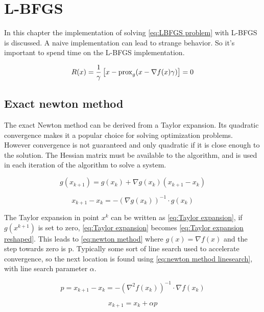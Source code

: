 \chapter{L-BFGS}
	In this chapter the implementation of solving \eqref{eq:LBFGS problem} with L-BFGS is discussed. A naive implementation can lead to strange behavior. So it's important to spend time on the L-BFGS implementation.
	
	
	\begin{equation}
	R(x) = \frac{1}{\gamma}\left[ x - \operatorname{prox}_g( x - \nabla f(x)\gamma) \right] = 0
	\label{eq:LBFGS problem}
	\end{equation}
	
	\section{Exact newton method}
	The exact Newton method can be derived from a Taylor expansion. Its quadratic convergence makes it a popular choice for solving optimization problems. However convergence is not guaranteed and only quadratic if it is close enough to the solution. The Hessian matrix must be available to the algorithm, and is used in each iteration of the algorithm to solve a system.
	
		\begin{equation}
			g(x_{k+1}) = g(x_k) + \nabla g(x_k)(x_{k+1}-x_k)
			\label{eq:Taylor expansion}
		\end{equation}
		
		\begin{equation}
			x_{k+1}-x_k = -(\nabla g(x_k))^{-1} \cdot g(x_k)
			\label{eq:Taylor expansion reshaped}
		\end{equation}
		
	The Taylor expansion in point $x^k$ can be written as \eqref{eq:Taylor expansion}, if $g(x^{k+1})$ is set to zero, \eqref{eq:Taylor expansion} becomes \eqref{eq:Taylor expansion reshaped}. This leads to \eqref{eq:newton method} where $g(x)=\nabla f(x)$ and the step towards zero is p. Typically some sort of line search used to accelerate convergence, so the next location is found using \eqref{eq:newton method linesearch}, with line search parameter $\alpha$.	
	
		\begin{equation}
			p = x_{k+1}-x_k = -(\nabla^2 f(x_k))^{-1} \cdot \nabla f(x_k)
			\label{eq:newton method}	
		\end{equation}
	
		\begin{equation}
		 	x_{k+1} = x_k + \alpha p
		 	\label{eq:newton method linesearch}
		\end{equation}
		
